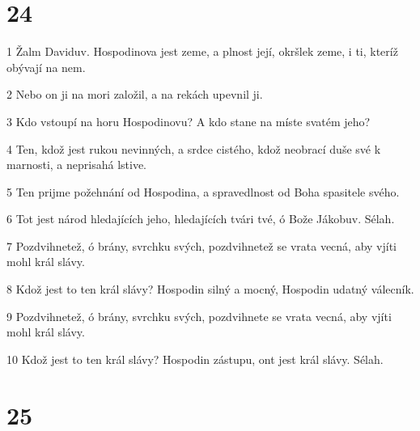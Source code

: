\chapter{24}

\par 1 Žalm Daviduv. Hospodinova jest zeme, a plnost její, okršlek zeme, i ti, kteríž obývají na nem.
\par 2 Nebo on ji na mori založil, a na rekách upevnil ji.
\par 3 Kdo vstoupí na horu Hospodinovu? A kdo stane na míste svatém jeho?
\par 4 Ten, kdož jest rukou nevinných, a srdce cistého, kdož neobrací duše své k marnosti, a neprisahá lstive.
\par 5 Ten prijme požehnání od Hospodina, a spravedlnost od Boha spasitele svého.
\par 6 Tot jest národ hledajících jeho, hledajících tvári tvé, ó Bože Jákobuv. Sélah.
\par 7 Pozdvihnetež, ó brány, svrchku svých, pozdvihnetež se vrata vecná, aby vjíti mohl král slávy.
\par 8 Kdož jest to ten král slávy? Hospodin silný a mocný, Hospodin udatný válecník.
\par 9 Pozdvihnetež, ó brány, svrchku svých, pozdvihnete se vrata vecná, aby vjíti mohl král slávy.
\par 10 Kdož jest to ten král slávy? Hospodin zástupu, ont jest král slávy. Sélah.

\chapter{25}

